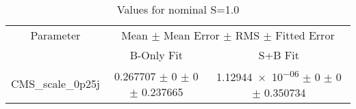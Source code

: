 \begin{table}
\centering
\caption{Values for nominal S=1.0}
\begin{tabular}{ccc}
\toprule
Parameter 	& \multicolumn{2}{c}{Mean $\pm$ Mean Error $\pm$ RMS $\pm$ Fitted Error}\\
 	& B-Only Fit & S+B Fit\\
\midrule
CMS\_scale\_0p25j 	& \num{0.267707} $\pm$ \num{0} $\pm$ \num{0} $\pm$ \num{0.237665} 	& \num{1.12944e-06} $\pm$ \num{0} $\pm$ \num{0} $\pm$ \num{0.350734}\\
\bottomrule
\end{tabular}
\end{table}